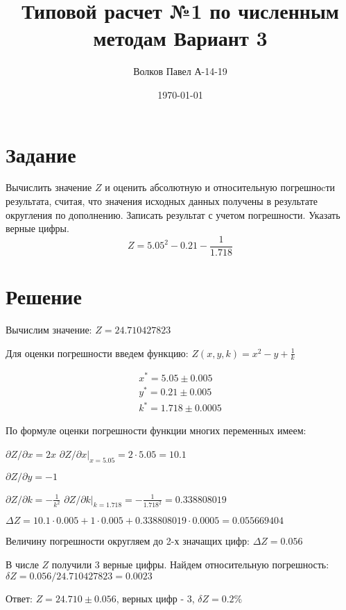 \documentclass[a4paper,12pt]{report} %
\author{Волков Павел А-14-19}
\title{Типовой расчет №1 по численным методам Вариант 3}
\date{\today}
\begin{document}

\maketitle

\newpage

\section*{Задание}
Вычислить значение $Z$ и оценить абсолютную и относительную
погрешноcти результата, считая, что значения исходных данных получены в результате округления по дополнению.
Записать результат с учетом погрешности. Указать верные цифры.
\[
    Z = 5.05^2 - 0.21 - \frac{1}{1.718}
\]

\section*{Решение}
Вычислим значение: $Z = 24.710427823$

Для оценки погрешности введем функцию:
$Z(x, y, k) = x^2 - y + \frac{1}{k}$

\begin{gather*}
    x^* = 5.05 \pm 0.005\\
    y^* = 0.21 \pm 0.005\\
    k^* = 1.718 \pm 0.0005
\end{gather*}

По формуле оценки погрешности функции многих переменных имеем:

$\partial Z / \partial x = 2x$
\newline$\partial Z / \partial x |_{x=5.05} = 2 \cdot 5.05 = 10.1$

$\partial Z / \partial y = -1 $

$\partial Z / \partial k = -\frac{1}{k^2} $
\newline$\partial Z / \partial k |_{k=1.718} = -\frac{1}{1.718^2} = 0.338808019 $

$\Delta Z = 10.1 \cdot 0.005 + 1 \cdot 0.005 + 0.338808019 \cdot 0.0005 = 0.055669404$

Величину погрешности округляем до 2-х значащих цифр: $\Delta Z=0.056$

В числе $Z$ получили 3 верные цифры. Найдем относительную погрешность:
\newline$\delta Z = 0.056 / 24.710427823 = 0.0023$

Ответ: $ Z = 24.710 \pm 0.056$, верных цифр - 3, $\delta Z = 0.2\%$
\end{document}
